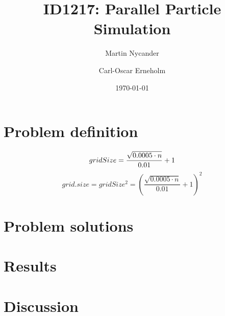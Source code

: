 \documentclass[titlepage,a4paper,10pt]{article}
\title{ID1217: Parallel Particle Simulation}
\author{Martin Nycander \and Carl-Oscar Erneholm}
\date{\today}
\begin{document}
\maketitle

\tableofcontents
\newpage

\setcounter{page}{1}

\section{Problem definition}
\begin{equation}
    gridSize = \frac{\sqrt{0.0005 \cdot n}}{0.01} + 1 \\
\end{equation}
\begin{equation}
    grid.size = gridSize^2 = \left(\frac{\sqrt{0.0005 \cdot n}}{0.01} + 1\right)^2
\end{equation}

\section{Problem solutions}




\section{Results}




\section{Discussion}

\end{document}
